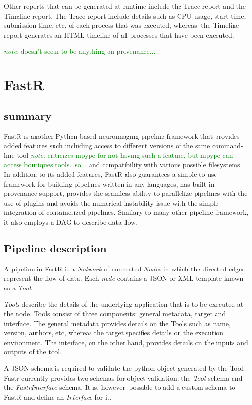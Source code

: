 \documentclass{report}
\newcommand{\note}[1]{\textcolor{green}{\textit{note}: #1}}
\begin{document}
    Other reports that can be generated at runtime include the Trace report and
the Timeline report. The Trace report include details such as CPU usage, start
time, submission time, etc, of each process that was executed, whereas, the
Timeline report generates an HTML timeline of all processes that have been
executed.        

    \note{doesn't seem to be anything on provenance...}

    \section{FastR}
        \subsection{summary}
        FastR is another Python-based neuroimaging pipeline framework that
provides added features such including access to different versions of the same
command-line tool \note{criticizes nipype for not having such a feature, but
nipype can access boutiques tools...so...} and compatibility with various
possible filesystems. In addition to its added features, FastR also guarantees
a simple-to-use framework for building pipelines written in any languages, has
built-in provenance support, provides the seamless ability to parallelize
pipelines with the use of plugins and avoids the numerical instability issue with
the simple integration of containerized pipelines. Similary to many other
pipeline framework, it also employs a DAG to describe data flow.
 
        \subsection{Pipeline description}
        A pipeline in FastR is a \textit{Network} of connected \textit{Nodes} in
which the directed edges represent the flow of data.  Each \textit{node}
contains a JSON or XML template known as a \textit{Tool}. 

\textit{Tools}
describe the details of the underlying application that is to be executed at the
node. Tools consist of three components: general metadata, target and interface.
The general metadata provides details on the Tools such as name, version,
authors, etc, whereas the target specifies details on the execution environment.
The interface, on the other hand, provides details on the inputs and outputs of
the tool. 

A JSON schema is required to validate the python object generated by the Tool. 
Fastr currently provides two schemas for object validation: the \textit{Tool} schema
and the \textit{FastrInterface} schema. It is, however, possible to add a custom
schema to FastR and define an \textit{Interface} for it. 
\end{document}
